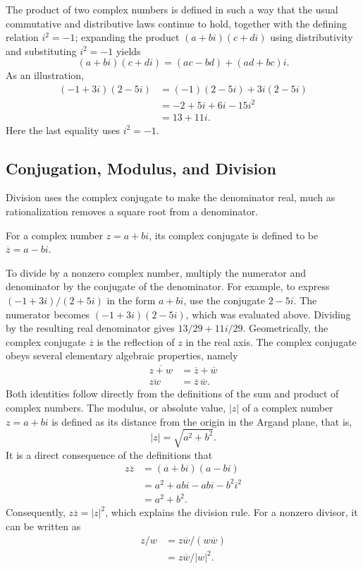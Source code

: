 The product of two complex numbers is defined in such a way that the usual commutative and distributive laws continue to hold, together with the
defining relation $i^2 = -1$; expanding the product $(a+bi)(c+di)$ using distributivity and substituting $i^2 = -1$ yields
\[
(a+bi)(c+di) = (ac - bd) + (ad+bc) i.
\]
As an illustration,
\[
\begin{aligned}
(-1+3i)(2-5i) &= (-1)(2-5i) + 3i(2-5i) \\
&= -2 + 5i + 6i - 15 i^2 \\
&= 13 + 11i.
\end{aligned}
\]
Here the last equality uses $i^2 = -1$.

\subsection{Conjugation, Modulus, and Division}

Division uses the complex conjugate to make the denominator real, much as rationalization removes a square root from a denominator.

\begin{definition}
For a complex number $z = a+bi$, its complex conjugate is defined to be $\overline{z} = a - bi$.
\end{definition}

To divide by a nonzero complex number, multiply the numerator and denominator by the conjugate of the denominator. For example, to express $(-1+3i)/(2+5i)$ in the form $a+bi$, use the conjugate $2-5i$. The numerator becomes $(-1+3i)(2-5i)$, which was evaluated above. Dividing by the resulting real denominator gives $13/29 + 11i/29$. Geometrically, the complex conjugate $\overline{z}$ is the reflection of $z$ in the real axis. The complex conjugate obeys several elementary
algebraic properties, namely
\[
\begin{aligned}
\overline{z+w} &= \overline{z} + \overline{w} \\
\overline{zw} &= \overline{z}\,\overline{w}.
\end{aligned}
\]
Both identities follow directly from the definitions of the sum and product of complex numbers. The modulus, or absolute value, $|z|$ of a complex
number $z = a+bi$ is defined as its distance from the origin in the Argand plane, that is,
\[
|z| = \sqrt{a^2+b^2}.
\]
It is a direct consequence of the definitions that
\[
\begin{aligned}
z \overline{z} &= (a+bi)(a-bi) \\
&= a^2 + abi - abi - b^2 i^2 \\
&= a^2 + b^2.
\end{aligned}
\]
Consequently, $z\overline{z} = |z|^2$, which explains the division rule. For a nonzero divisor, it can be written as
\[
\begin{aligned}
z/w &= z\overline{w}/(w\overline{w}) \\
&= z\overline{w}/|w|^2.
\end{aligned}
\]

